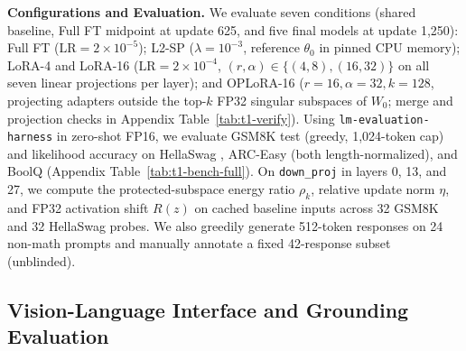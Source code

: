\documentclass{article}
\begin{document}
\textbf{Configurations and Evaluation.} We evaluate seven conditions (shared baseline, Full FT midpoint at update 625, and five final models at update 1,250): Full FT ($\text{LR}=2\times 10^{-5}$); L2-SP \citep{li2018l2sp} ($\lambda=10^{-3}$, reference $\theta_0$ in pinned CPU memory); LoRA-4 and LoRA-16 \citep{hu2022lora} ($\text{LR}=2\times 10^{-4}$, $(r,\alpha)\in\{(4,8),(16,32)\}$ on all seven linear projections per layer); and OPLoRA-16 \citep{xiong2026oplora} ($r=16, \alpha=32, k=128$, projecting adapters outside the top-$k$ FP32 singular subspaces of $W_0$; merge and projection checks in Appendix Table~\ref{tab:t1-verify}). Using \texttt{lm-\allowbreak evaluation-\allowbreak harness} \citep{gao2024lmevalharness} in zero-shot FP16, we evaluate GSM8K test \citep{cobbe2021gsm8k} (greedy, 1,024-token cap) and likelihood accuracy on HellaSwag \citep{zellers2019hellaswag}, ARC-Easy \citep{clark2018arc} (both length-normalized), and BoolQ \citep{clark2019boolq} (Appendix Table~\ref{tab:t1-bench-full}). On \texttt{down\_proj} in layers 0, 13, and 27, we compute the protected-subspace energy ratio $\rho_k$, relative update norm $\eta$, and FP32 activation shift $R(z)$ on cached baseline inputs across 32 GSM8K and 32 HellaSwag probes. We also greedily generate 512-token responses on 24 non-math prompts \citep{betley2025emergent} and manually annotate a fixed 42-response subset (unblinded).

\subsection{Vision-Language Interface and Grounding Evaluation}
\label{sec:setup-vlm}
\end{document}
